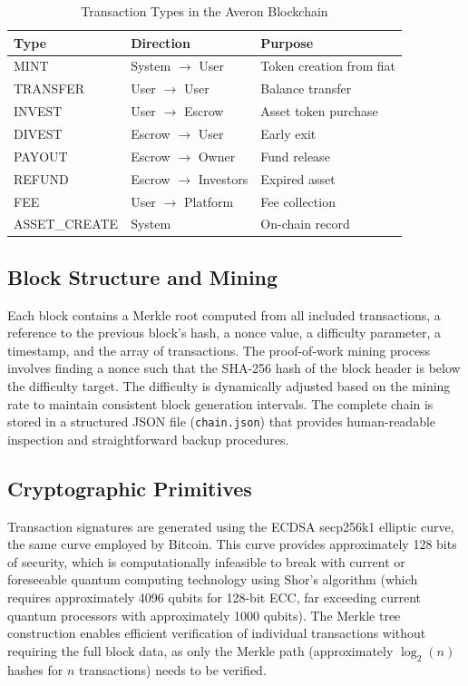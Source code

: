 \documentclass[conference]{IEEEtran}
\begin{document}
\begin{table}[t]
\centering
\caption{Transaction Types in the Averon Blockchain}
\label{tab:tx_types}
\begin{tabular}{@{}llp{3.2cm}@{}}
\toprule
\textbf{Type} & \textbf{Direction} & \textbf{Purpose} \\
\midrule
MINT & System $\to$ User & Token creation from fiat \\
TRANSFER & User $\to$ User & Balance transfer \\
INVEST & User $\to$ Escrow & Asset token purchase \\
DIVEST & Escrow $\to$ User & Early exit \\
PAYOUT & Escrow $\to$ Owner & Fund release \\
REFUND & Escrow $\to$ Investors & Expired asset \\
FEE & User $\to$ Platform & Fee collection \\
ASSET\_CREATE & System & On-chain record \\
\bottomrule
\end{tabular}
\end{table}

\subsection{Block Structure and Mining}

Each block contains a Merkle root computed from all included transactions, a reference to the previous block's hash, a nonce value, a difficulty parameter, a timestamp, and the array of transactions. The proof-of-work mining process involves finding a nonce such that the SHA-256 hash of the block header is below the difficulty target. The difficulty is dynamically adjusted based on the mining rate to maintain consistent block generation intervals. The complete chain is stored in a structured JSON file (\texttt{chain.json}) that provides human-readable inspection and straightforward backup procedures.

\subsection{Cryptographic Primitives}

Transaction signatures are generated using the ECDSA secp256k1 elliptic curve, the same curve employed by Bitcoin. This curve provides approximately 128 bits of security, which is computationally infeasible to break with current or foreseeable quantum computing technology using Shor's algorithm (which requires approximately 4096 qubits for 128-bit ECC, far exceeding current quantum processors with approximately 1000 qubits). The Merkle tree construction enables efficient verification of individual transactions without requiring the full block data, as only the Merkle path (approximately $\log_2(n)$ hashes for $n$ transactions) needs to be verified.
\end{document}
